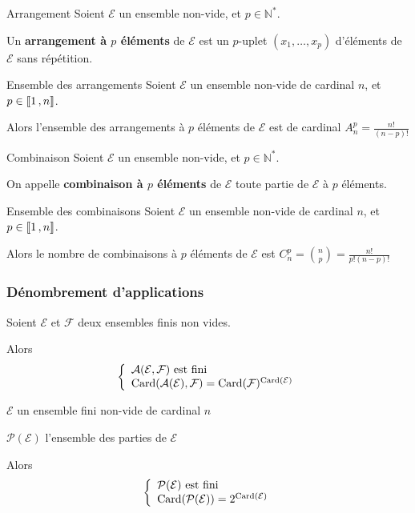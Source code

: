     \begin{defi}{Arrangement}{}
        Soient $\mathcal{E}$ un ensemble non-vide, et $p \in \mathbb{N}^*$.

        Un \textbf{arrangement à $p$ éléments} de $\mathcal{E}$ est un $p$-uplet $(x_1,\ldots,x_p)$ d’éléments de $\mathcal{E}$ sans répétition.
    \end{defi}

    \begin{theo}{Ensemble des arrangements}{}
        Soient $\mathcal{E}$ un ensemble non-vide de cardinal $n$, et $p \in \left\llbracket 1 \, , n \right\rrbracket$.

        Alors l’ensemble des arrangements à $p$ éléments de $\mathcal{E}$ est de cardinal $A_n^p = \frac{n!}{(n-p)!}$
    \end{theo}

    \begin{defi}{Combinaison}{}
        Soient $\mathcal{E}$ un ensemble non-vide, et $p \in \mathbb{N}^*$.

        On appelle \textbf{combinaison à $p$ éléments} de $\mathcal{E}$ toute partie de $\mathcal{E}$ à $p$ éléments.
    \end{defi}

    \begin{theo}{Ensemble des combinaisons}{}
        Soient $\mathcal{E}$ un ensemble non-vide de cardinal $n$, et $p \in \left\llbracket 1 \, , n \right\rrbracket$.

        Alors le nombre de combinaisons à $p$ éléments de $\mathcal{E}$ est  $C_n^p = \binom{n}{p} = \frac{n!}{p!(n-p)!}$
    \end{theo}

    \subsubsection{Dénombrement d’applications}

    \begin{theo}{}{}
        Soient $\mathcal{E}$ et $\mathcal{F}$ deux ensembles finis non vides.

        Alors 
        \[ \et{\mathcal{A}(\mathcal{E},\mathcal{F}) \text{ est fini}}{\card(\mathcal{A}(\mathcal{E}),\mathcal{F}) = \card(\mathcal{F})^{\card(\mathcal{E})}} \]
    \end{theo}

    \begin{coro}{}{}
        \begin{soient}
            \item $\mathcal{E}$ un ensemble fini non-vide de cardinal $n$
            \item $\mathcal{P}(\mathcal{E})$ l’ensemble des parties de $\mathcal{E}$
        \end{soient}
        Alors 
        \[ \et{\mathcal{P}(\mathcal{E}) \text{ est fini}}{\card(\mathcal{P}(\mathcal{E})) = 2^{\card(\mathcal{E})}} \]
    \end{coro}

